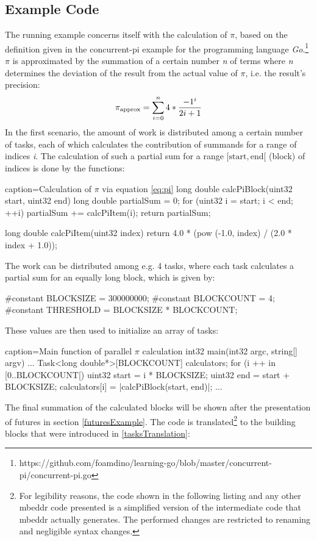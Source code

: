 \subsection{Example Code}
\label{taskExample}
The running example concerns itself with the calculation of $\pi$, based on the definition given in the concurrent-pi example for the programming language \textit{Go}.\footnote{https://github.com/foamdino/learning-go/blob/master/concurrent-pi/concurrent-pi.go} $\pi$ is approximated by the summation of a certain number \textit{n} of terms where \textit{n} determines the deviation of the result from the actual value of $\pi$, i.e. the result's precision: 
\begin{equation}\label{eq:pi}
{\pi}_{\mathrm{approx}} = \sum\limits_{i=0}^{n}4*{-1^i \over 2i+1}
\end{equation}
In the first scenario, the amount of work is distributed among a certain number of tasks, each of which calculates the contribution of summands for a range of indices \textit{i}. The calculation of such a partial sum for a range $[\mathrm{start}, \mathrm{end}[$ (block) of indices is done by the functions:
\begin{ccode}{caption=Calculation of $\pi$ via equation \ref{eq:pi}}
long double calcPiBlock(uint32 start, uint32 end) { 
  long double partialSum = 0; 
  for (uint32 i = start; i < end; ++i) { partialSum += calcPiItem(i); }
  return partialSum; 
}
 
long double calcPiItem(uint32 index) { 
  return 4.0 * (pow (-1.0, index) / (2.0 * index + 1.0)); 
}
\end{ccode}
The work can be distributed among e.g. 4 tasks, where each task calculates a partial sum for an equally long block, which is given by:
\begin{ccode}{}
#constant BLOCKSIZE = 300000000;
#constant BLOCKCOUNT = 4; 
#constant THRESHOLD = BLOCKSIZE * BLOCKCOUNT;
\end{ccode}
These values are then used to initialize an array of tasks:
\begin{ccode}{caption=Main function of parallel $\pi$ calculation}
int32 main(int32 argc, string[] argv) {
  ...
  Task<long double*>[BLOCKCOUNT] calculators;
  for (i ++ in [0..BLOCKCOUNT[) { 
    uint32 start = i * BLOCKSIZE; 
    uint32 end = start + BLOCKSIZE; 
    calculators[i] = |calcPiBlock(start, end)|; 
  } ...
}
\end{ccode}
The final summation of the calculated blocks will be shown after the presentation of futures in section \ref{futuresExample}. The code is translated\footnote{For legibility reasons, the code shown in the following listing and any other mbeddr code presented is a simplified version of the intermediate code that mbeddr actually generates. The performed changes are restricted to renaming and negligible syntax changes.} to the building blocks that were introduced in \ref{tasksTranslation}:
